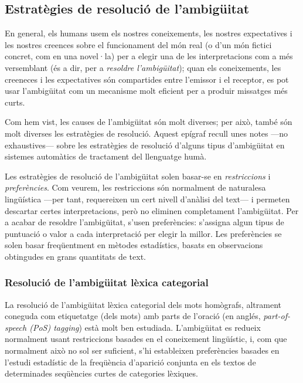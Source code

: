 \subsection{Estratègies de resolució de l'ambigüitat}

En general, els humans usem els nostres coneixements, les nostres
expectatives i les nostres creences sobre el funcionament del món real
(o d'un món fictici concret, com en una novel·la) per a elegir una de
les interpretacions com a més versemblant (és a dir, per a
\emph{resoldre l'ambigüitat}); quan els coneixements, les creeneces i
les expectatives són compartides entre l'emissor i el receptor, es pot
usar l'ambigüitat com un mecanisme molt eficient per a produir
missatges més curts.

Com hem vist, les causes de l'ambigüitat són molt diverses; per això,
també són molt diverses les estratègies de resolució. Aquest epígraf
recull unes notes ---no exhaustives--- sobre les estratègies de
resolució d'alguns tipus d'ambigüitat en sistemes automàtics de
tractament del llenguatge humà.

Les estratègies de resolució de l'ambigüitat solen basar-se en
\emph{restriccions} i \emph{preferències}. Com veurem, les
restriccions són normalment de naturalesa lingüística ---per tant,
requereixen un cert nivell d'anàlisi del text--- i permeten descartar
certes interpretacions, però no eliminen completament l'ambigüitat.
Per a acabar de resoldre l'ambigüitat, s'usen preferències: s'assigna
algun tipus de puntuació o valor a cada interpretació per elegir la
millor. Les preferències se solen basar freqüentment en mètodes
estadístics, basats en observacions obtingudes en grans quantitats de
text.


\subsubsection{Resolució de l'ambigüitat lèxica categorial} 
\label{s3:reshom}

La resolució de l'ambigüitat lèxica categorial dels mots homògrafs,
altrament coneguda com etiquetatge (dels mots) amb parts de l'oració
(en anglés, \emph{part-of-speech (PoS) tagging}) està molt ben
estudiada.  L'ambigüitat es redueix normalment usant restriccions
basades en el coneixement lingüístic, i, com que normalment això no
sol ser suficient, s'hi estableixen preferències basades en l'estudi
estadístic de la freqüència d'aparició conjunta en els textos de
determinades seqüències curtes de categories lèxiques.

